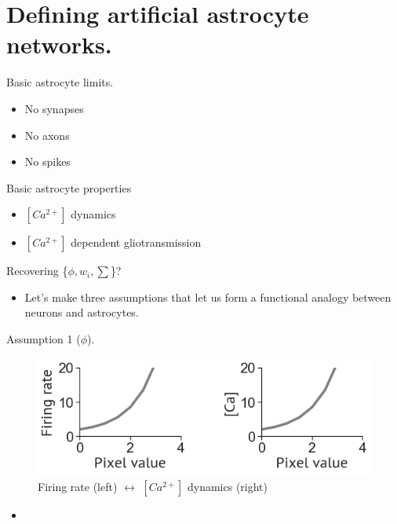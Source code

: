 \documentclass[10pt]{beamer}
\begin{document}
\section[AANs]{Defining artificial astrocyte networks.}

\begin{frame}[fragile]{Basic astrocyte limits.}
\begin{itemize}
    \item No synapses
    \item No axons 
    \item No spikes
\end{itemize}
\end{frame}


\begin{frame}[fragile]{Basic astrocyte properties}
\begin{itemize}
    \item $[Ca^{2+}]$ dynamics
    \item $[Ca^{2+}]$ dependent gliotransmission
\end{itemize}
\end{frame}

\begin{frame}[fragile]{Recovering \{$\phi, w_i, \sum $\}?}
\begin{itemize}
    \item Let's make three assumptions that let us form a functional analogy between neurons and astrocytes.
\end{itemize}
\end{frame}

\begin{frame}[fragile]{Assumption 1 ($\phi$).}
\begin{figure}
    \centering
    \includegraphics[scale=0.4]{images/phi_ca.png}
    \caption{Firing rate (left) $\leftrightarrow$ $[Ca^{2+}]$ dynamics (right)}
\end{figure}
\begin{itemize}
    \item 
\end{itemize}
\end{frame}
\end{document}
